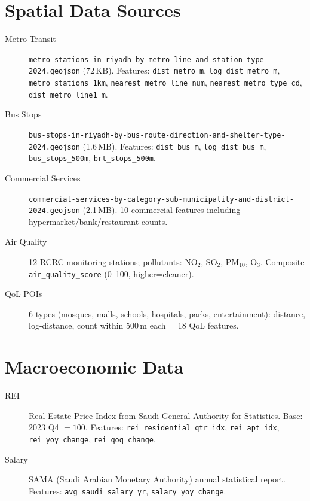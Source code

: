 \documentclass[11pt, a4paper, twoside]{report}
\begin{document}
\section{Spatial Data Sources}

\begin{description}
  \item[Metro Transit] \texttt{metro-stations-in-riyadh-by-metro-line-and-station-type-2024.geojson}
        (72\,KB). Features: \texttt{dist\_metro\_m}, \texttt{log\_dist\_metro\_m},
        \texttt{metro\_stations\_1km}, \texttt{nearest\_metro\_line\_num},
        \texttt{nearest\_metro\_type\_cd}, \texttt{dist\_metro\_line1\_m}.
  \item[Bus Stops] \texttt{bus-stops-in-riyadh-by-bus-route-direction-and-shelter-type-2024.geojson}
        (1.6\,MB). Features: \texttt{dist\_bus\_m}, \texttt{log\_dist\_bus\_m},
        \texttt{bus\_stops\_500m}, \texttt{brt\_stops\_500m}.
  \item[Commercial Services] \texttt{commercial-services-by-category-sub-municipality-and-district-2024.geojson}
        (2.1\,MB). 10 commercial features including hypermarket/bank/restaurant counts.
  \item[Air Quality] 12 RCRC monitoring stations; pollutants: NO$_2$, SO$_2$,
        PM$_{10}$, O$_3$. Composite \texttt{air\_quality\_score} (0--100, higher=cleaner).
  \item[QoL POIs] 6 types (mosques, malls, schools, hospitals, parks, entertainment):
        distance, log-distance, count within 500\,m each = 18 QoL features.
\end{description}

\section{Macroeconomic Data}

\begin{description}
  \item[REI] Real Estate Price Index from Saudi General Authority for Statistics.
        Base: 2023 Q4 $= 100$. Features: \texttt{rei\_residential\_qtr\_idx},
        \texttt{rei\_apt\_idx}, \texttt{rei\_yoy\_change}, \texttt{rei\_qoq\_change}.
  \item[Salary] SAMA (Saudi Arabian Monetary Authority) annual statistical report.
        Features: \texttt{avg\_saudi\_salary\_yr}, \texttt{salary\_yoy\_change}.
\end{description}
\end{document}
